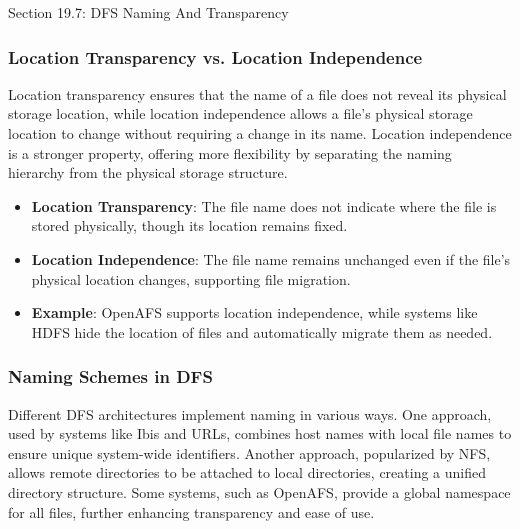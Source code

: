 \begin{notes}{Section 19.7: DFS Naming And Transparency}
    \subsubsection*{Location Transparency vs. Location Independence}
    
    Location transparency ensures that the name of a file does not reveal its physical storage location, while location independence allows a file's physical storage location to change without requiring 
    a change in its name. Location independence is a stronger property, offering more flexibility by separating the naming hierarchy from the physical storage structure.
    
    \begin{highlight}
    
        \begin{itemize}
            \item \textbf{Location Transparency}: The file name does not indicate where the file is stored physically, though its location remains fixed.
            \item \textbf{Location Independence}: The file name remains unchanged even if the file's physical location changes, supporting file migration.
            \item \textbf{Example}: OpenAFS supports location independence, while systems like HDFS hide the location of files and automatically migrate them as needed.
        \end{itemize}
    
    \end{highlight}
    
    \subsubsection*{Naming Schemes in DFS}
    
    Different DFS architectures implement naming in various ways. One approach, used by systems like Ibis and URLs, combines host names with local file names to ensure unique system-wide identifiers. 
    Another approach, popularized by NFS, allows remote directories to be attached to local directories, creating a unified directory structure. Some systems, such as OpenAFS, provide a global namespace 
    for all files, further enhancing transparency and ease of use.
    
    \begin{highlight}
    

\end{highlight}
\end{notes}
